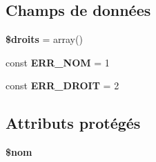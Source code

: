 \subsection*{Champs de données}
\begin{DoxyCompactItemize}
\item 
\hypertarget{class_library_1_1_entities_1_1_groupe_a1c1d6ed6050592d726558a0c861868af}{{\bfseries \$droits} = array()}\label{class_library_1_1_entities_1_1_groupe_a1c1d6ed6050592d726558a0c861868af}

\item 
\hypertarget{class_library_1_1_entities_1_1_groupe_a6a161eaec87fb712748dd42b7710dc45}{const {\bfseries E\+R\+R\+\_\+\+N\+O\+M} = 1}\label{class_library_1_1_entities_1_1_groupe_a6a161eaec87fb712748dd42b7710dc45}

\item 
\hypertarget{class_library_1_1_entities_1_1_groupe_a069cd34319358abadeed0a8d3af42927}{const {\bfseries E\+R\+R\+\_\+\+D\+R\+O\+I\+T} = 2}\label{class_library_1_1_entities_1_1_groupe_a069cd34319358abadeed0a8d3af42927}

\end{DoxyCompactItemize}
\subsection*{Attributs protégés}
\begin{DoxyCompactItemize}
\item 
\hypertarget{class_library_1_1_entities_1_1_groupe_ac72f7055f1354a72cd1dcca5d9f1e121}{{\bfseries \$nom}}\label{class_library_1_1_entities_1_1_groupe_ac72f7055f1354a72cd1dcca5d9f1e121}

\end{DoxyCompactItemize}


